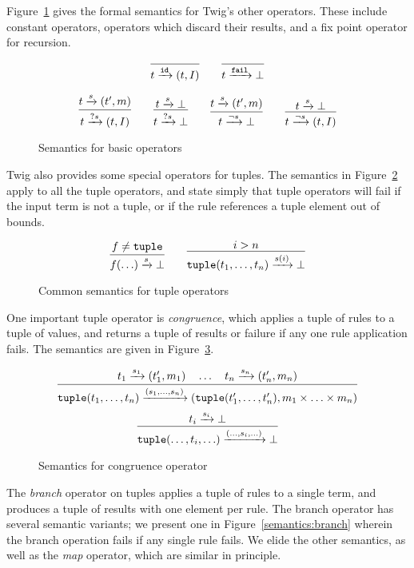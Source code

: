 Figure~\ref{semantics:basic} gives the formal semantics for Twig's other
operators. These include constant operators, operators which discard their
results, and a fix point operator for recursion.

\begin{figure}[ht]
\label{semantics:basic}
\[
\infer{t \arr{\mathtt{id}} (t,I)}{}
\qquad
\infer{t \arr{\mathtt{fail}} \bot}{}
\]

\[
\infer{t \arr{?s} (t,I)}{t \arr{s} (t',m)}
\qquad 
\infer{t \arr{?s} \bot}{t \arr{s} \bot}
\qquad
\infer{t \arr{\lnot s} \bot}{t \arr{s} (t',m)}
\qquad 
\infer{t \arr{\lnot s} (t,I)}{t \arr{s} \bot}
\]

\caption{Semantics for basic operators}
\end{figure}

Twig also provides some special operators for tuples. The semantics in
Figure~\ref{semantics:all-tuples} apply to all the tuple operators, and state
simply that tuple operators will fail if the input term is not a tuple, or if
the rule references a tuple element out of bounds.


\begin{figure}[ht]
\label{semantics:all-tuples}
\[
\infer{f(\ldots) \arr{s} \bot}
{f \neq \mathtt{tuple}}
\qquad
\infer{\mathtt{tuple}(t_1,\ldots,t_n) \arr{s(i)} \bot}{i > n}
\]
\caption{Common semantics for tuple operators}
\end{figure}


One important tuple operator is \emph{congruence}, which applies a tuple of
rules to a tuple of values, and returns a tuple of results or failure if any
one rule application fails. The semantics are given in
Figure~\ref{semantics:congruence}.


\begin{figure}[ht]
\label{semantics:congruence}
\[
\infer{
\mathtt{tuple}(t_1,\ldots,t_n)
\arr{(s_1,\ldots,s_n)}
(\mathtt{tuple}(t_1',\ldots,t_n'),m_1 \times \ldots \times m_n) }
{t_1 \arr{s_1} (t_1',m_1) \quad \ldots \quad t_n \arr{s_n} (t_n',m_n)}
\]
\[
\infer{
\mathtt{tuple}(\ldots,t_i,\ldots)
\arr{(\ldots,s_i,\ldots)}
\bot}
{t_i \arr{s_i} \bot}
\]
\caption{Semantics for congruence operator}
\end{figure}


The \emph{branch} operator on tuples applies a tuple of rules to a single
term, and produces a tuple of results with one element per rule. The branch
operator has several semantic variants; we present one in
Figure~\ref{semantics:branch} wherein the branch operation fails if any single
rule fails. We elide the other semantics, as well as the \emph{map} operator,
which are similar in principle.

